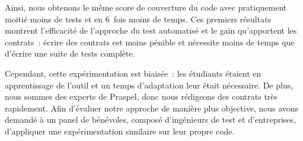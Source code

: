 Ainsi, nous obtenons le même score de couverture du code avec pratiquement
moitié moins de tests et en 6~fois moins de temps. Ces premiers résultats
montrent l'efficacité de l'approche du test automatisé et le gain qu'apportent
les contrats~: écrire des contrats est moins pénible et nécessite moins de temps
que d'écrire une suite de tests complète.

Cependant, cette expérimentation est biaisée~: les étudiants étaient en
apprentissage de l'outil et un temps d'adaptation leur était nécessaire. De
plus, nous sommes des experts de Praspel, donc nous rédigeons des contrats très
rapidement. Afin d'évaluer notre approche de manière plus objective, nous avons
demandé à un panel de bénévoles, composé d'ingénieurs de test et d'entreprises,
d'appliquer une expérimentation similaire sur leur propre code.

